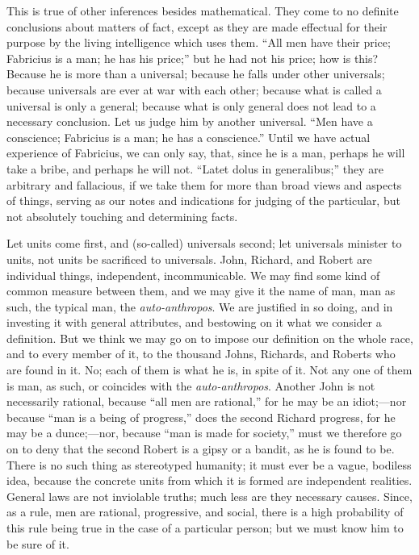 This is true of other inferences besides mathematical. They come to
no definite conclusions about matters of fact, except as they are made
effectual for their purpose by the living intelligence which uses
them. ``All men have their price; Fabricius is a man; he has his
price;'' but he had not his price; how is this? Because he is more
than a universal; because he falls under other universals; because
universals are ever at war with each other; because what is called a
universal is only a general; because what is only general does not
lead to a necessary conclusion. Let us judge him by another universal.
``Men have a conscience; Fabricius is a man; he has a
conscience.'' Until we have actual experience of Fabricius, we can
only say, that, since he is a man, perhaps he will take a bribe, and
perhaps he will not. ``Latet dolus in generalibus;'' they are
arbitrary and fallacious, if we take them for more than broad views
and aspects of things, serving as our notes and indications for
judging of the particular, but not absolutely touching and determining
facts.

Let units come first, and (so-called) universals second; let
universals minister to units, not units be sacrificed to universals.
John, Richard, and Robert are individual things, independent,
incommunicable. We may find some kind of common measure between them,
and we may give it the name of man, man as such, the typical man, the \emph{auto-anthropos}. We are justified in so doing, and in
investing it with general attributes, and bestowing on it what we
consider a definition. But we think we may go on to impose our
definition on the whole race, and to every member of it, to the
thousand Johns, Richards, and Roberts who are found in it. No; each of
them is what he is, in spite of it. Not any one of them is man, as
such, or coincides with the \emph{auto-anthropos}. Another John is not
necessarily rational, because ``all men are rational,'' for he
may be an idiot;—nor because ``man is a being of progress,''
does the second Richard progress, for he may be a dunce;—nor,
because ``man is made for society,'' must we therefore go on
to deny that the second Robert is a gipsy or a bandit, as he is found
to be. There is no such thing as stereotyped humanity; it must ever be
a vague, bodiless idea, because the concrete units from which it is
formed are independent realities. General laws are not inviolable
truths; much less are they necessary causes. Since, as a rule, men are
rational, progressive, and social, there is a high probability of this
rule being true in the case of a particular person; but we must know
him to be sure of it.

